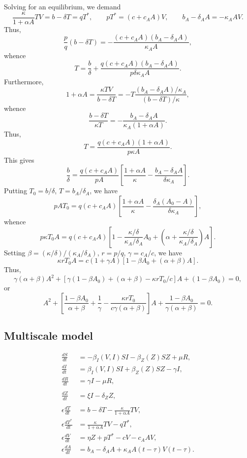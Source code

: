 \documentclass[11pt]{article}
\begin{document}
    Solving for an equilibrium, we demand \[
        \frac{\kappa}{1 + \alpha A} TV = b - \delta T = q T^*, \qquad
        pT^* = (c + c_A A)V, \qquad
        b_A - \delta_AA = -\kappa_A AV.
    \] Thus, \[
        \frac{p}{q}(b - \delta T) = -\frac{(c + c_A A)(b_A - \delta_A A)}{\kappa_A A},
    \] whence \[
        T = \frac{b}{\delta} + \frac{q(c + c_A A)(b_A - \delta_A A)}{p \delta \kappa_A A}.
    \] Furthermore, \[
        1 + \alpha A = \frac{\kappa TV}{b - \delta T} = -T \frac{(b_A - \delta_A A) / \kappa_A}{(b - \delta T) / \kappa},
    \] whence \[
        \frac{b - \delta T}{\kappa T} = - \frac{b_A - \delta_A A}{\kappa_A (1 + \alpha A)}.
    \] Thus, \[
        T  = \frac{q(c + c_A A)(1 + \alpha A)}{p\kappa A}.
    \] This gives \[
        \frac{b}{\delta} = \frac{q(c + c_A A)}{pA}\left[\frac{1 + \alpha A}{\kappa} - \frac{b_A - \delta_A A}{\delta \kappa_A}\right].
    \] Putting $T_0 = b / \delta$, $T = b_A / \delta_A$, we have \[
        pAT_0 = q(c + c_A A)\left[\frac{1 + \alpha A}{\kappa} - \frac{\delta_A(A_0 - A)}{\delta \kappa_A}\right],
    \] whence \[
        p\kappa T_0 A
        = q(c + c_A A)\left[1 - \frac{\kappa/\delta}{\kappa_A/\delta_A}A_0 + \left(\alpha + \frac{\kappa / \delta}{\kappa_A / \delta_A}\right)A\right].
    \] Setting $\beta = (\kappa / \delta) / (\kappa_A / \delta_A)$, $r = p /
    q$, $\gamma = c_A / c$, we have \[
        \kappa r T_0 A = c(1 + \gamma A)[1 - \beta A_0 + (\alpha + \beta)A].
    \] Thus, \[
        \gamma(\alpha + \beta)A^2 + [\gamma(1 - \beta A_0) + (\alpha + \beta) - \kappa r T_0 / c] A + (1 - \beta A_0) = 0,
    \] or \[
        A^2 + \left[\frac{1 - \beta A_0}{\alpha + \beta} + \frac{1}{\gamma} - \frac{\kappa r T_0}{c\gamma(\alpha + \beta)}\right] A + \frac{1 - \beta A_0}{\gamma(\alpha + \beta)} = 0.
    \]


    \subsection{Multiscale model}

    \begin{align}
        \frac{dS}{dt} &= -\beta_I(V, I) SI - \beta_Z(Z) SZ + \mu R, \\
        \frac{dI}{dt} &= \beta_I(V, I) SI + \beta_Z(Z) SZ - \gamma I, \\
        \frac{dR}{dt} &= \gamma I - \mu R, \\\\
        \frac{dZ}{dt} &= \xi I - \delta_Z Z, \\\\
        \epsilon \frac{dT}{dt} &= b -  \delta T - \frac{\kappa}{1 + \alpha A} TV, \\
        \epsilon \frac{dT^*}{dt} &= \frac{\kappa}{1 + \alpha A} TV - qT^*, \\
        \epsilon \frac{dV}{dt} &= \eta Z + pT^* - cV - c_A AV, \\
        \epsilon \frac{dA}{dt} &= b_A -  \delta_A A + \kappa_A A(t - \tau)V(t - \tau).
    \end{align}
\end{document}
